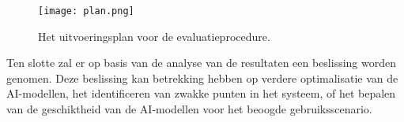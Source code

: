 \begin{figure}[h]
    \centering
    \texttt{[image: plan.png]}
    \captionsetup{justification=centering}
    \caption{Het uitvoeringsplan voor de evaluatieprocedure.}
    \label{fig:plan_methodologie}
\end{figure}


Ten slotte zal er op basis van de analyse van de resultaten een beslissing worden genomen. Deze beslissing kan betrekking hebben op verdere optimalisatie van de AI-modellen, het identificeren van zwakke punten in het systeem, of het bepalen van de geschiktheid van de AI-modellen voor het beoogde gebruiksscenario.



